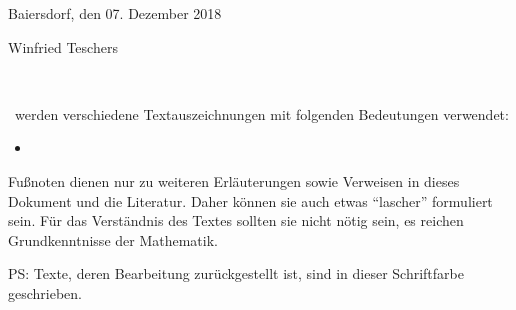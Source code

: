 Baiersdorf, den 07. Dezember 2018

Winfried Teschers

\Endchapter

\newpage

\label                    {cha:Vereinbarungen}
~\vskip 1.6cm
\vskip 0.8cm

\Hier\ werden verschiedene Textauszeichnungen mit folgenden Bedeutungen verwendet:

\begin{itemize}
	\item []
\end{itemize}

Fußnoten dienen nur zu weiteren Erläuterungen sowie Verweisen in dieses Dokument und die Literatur.
Daher können sie auch etwas "`lascher"' formuliert sein.
Für das Verständnis des Textes sollten sie nicht nötig sein, es reichen Grundkenntnisse der Mathematik.

\iftestFlg
	\bigskip
	\begin{offen}
		PS: Texte, deren Bearbeitung zurückgestellt ist, sind in dieser Schriftfarbe geschrieben.
	\end{offen}
\else\fi

\Endchapter
